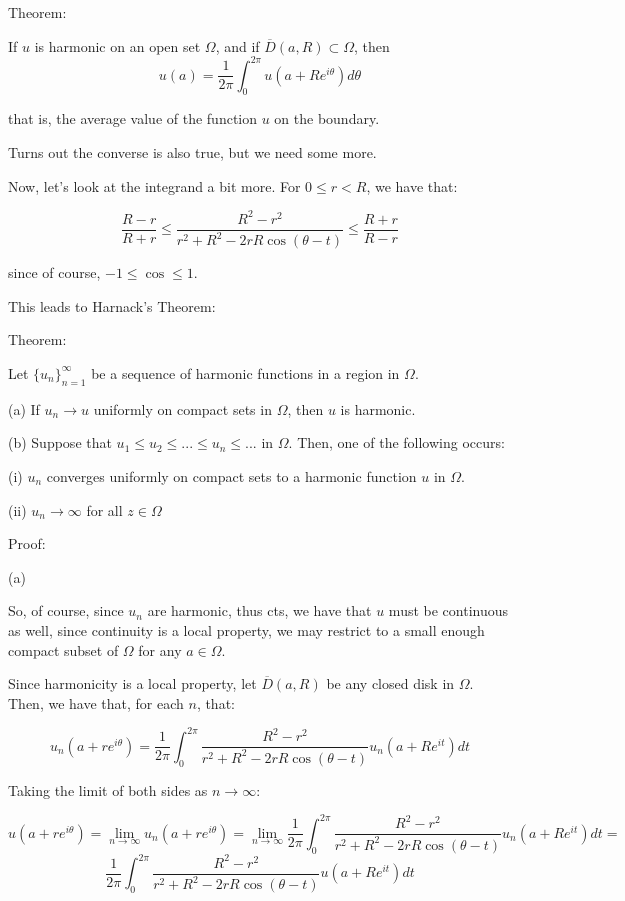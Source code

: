 \documentclass[10pt]{article}
\begin{document}
Theorem:

If $u$ is harmonic on an open set $\Omega$, and if $\overline{D}(a,R) \subset \Omega$, then $$u(a) = \frac{1}{2\pi} \int_0^{2\pi} u(a + Re^{i\theta}) d\theta$$

that is, the average value of the function $u$ on the boundary. 

Turns out the converse is also true, but we need some more.

Now, let’s look at the integrand a bit more. For $0 \leq r < R$, we have that:

$$\frac{R-r}{R+r} \leq \frac{R^2 - r^2}{r^2 + R^2 - 2rR \cos(\theta - t)}  \leq \frac{R + r}{R - r}$$

since of course, $-1 \leq \cos \leq 1$.

This leads to Harnack’s Theorem:

Theorem:

Let $\{ u_n \}_{n=1}^\infty$ be a sequence of harmonic functions in a region in $\Omega$.

(a) If $u_n \to u$ uniformly on compact sets in $\Omega$, then $u$ is harmonic.

(b) Suppose that $u_1 \leq u_2 \leq ... \leq u_n \leq ... $ in $\Omega$. Then, one of the following occurs:

(i) $u_n$ converges uniformly on compact sets to a harmonic function $u$ in $\Omega$.

(ii) $u_n \to \infty$ for all $z \in \Omega$

Proof:

(a)

So, of course, since $u_n$ are harmonic, thus cts, we have that $u$ must be continuous as well, since continuity is a local property, we may restrict to a small enough compact subset of $\Omega$ for any $a \in \Omega$.

Since harmonicity is a local property, let $\overline{D}(a,R)$ be any closed disk in $\Omega$. Then, we have that, for each $n$, that:

$$u_n(a + re^{i\theta}) = \frac{1}{2\pi} \int_0^{2\pi}  \frac{R^2 - r^2}{r^2 + R^2 - 2rR \cos(\theta - t)} u_n(a + Re^{it}) dt$$

Taking the limit of both sides as $n \to \infty$:

$$u(a + re^{i\theta}) = \lim_{n \to \infty} u_n(a + re^{i\theta}) = \lim_{n\to\infty} \frac{1}{2\pi} \int_0^{2\pi}  \frac{R^2 - r^2}{r^2 + R^2 - 2rR \cos(\theta - t)} u_n(a + Re^{it}) dt = $$ 
$$\frac{1}{2\pi} \int_0^{2\pi}  \frac{R^2 - r^2}{r^2 + R^2 - 2rR \cos(\theta - t)} u(a + Re^{it}) dt $$
\end{document}
